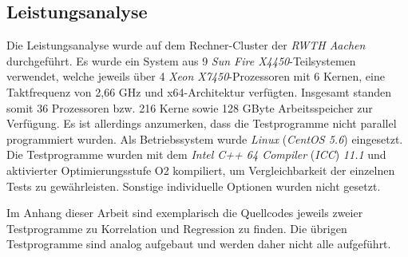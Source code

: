 \subsection{Leistungsanalyse}
\label{sec:leistungsanalyse}

Die Leistungsanalyse wurde auf dem Rechner-Cluster der {\it RWTH Aachen} durchgeführt. Es wurde ein System aus 9 {\it Sun Fire X4450}-Teilsystemen verwendet, welche jeweils über 4 {\it Xeon X7450}-Prozessoren mit 6 Kernen, eine Taktfrequenz von 2,66 GHz und x64-Architektur verfügten. Insgesamt standen somit 36 Prozessoren bzw. 216 Kerne sowie 128 GByte Arbeitsspeicher zur Verfügung. Es ist allerdings anzumerken, dass die Testprogramme nicht parallel programmiert wurden. Als Betriebssystem wurde {\it Linux} ({\it CentOS 5.6}) eingesetzt. Die Testprogramme wurden mit dem {\it Intel C++ 64 Compiler} ({\it ICC}) {\it 11.1} und aktivierter Optimierungsstufe O2 kompiliert, um Vergleichbarkeit der einzelnen Tests zu gewährleisten. Sonstige individuelle Optionen wurden nicht gesetzt.

Im Anhang dieser Arbeit sind exemplarisch die Quellcodes jeweils zweier Testprogramme zu Korrelation und Regression zu finden. Die übrigen Testprogramme sind analog aufgebaut und werden daher nicht alle aufgeführt.

